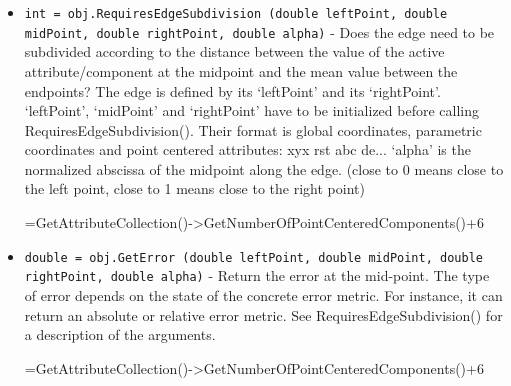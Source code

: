 \begin{itemize}
\item  \verb|int = obj.RequiresEdgeSubdivision (double leftPoint, double midPoint, double rightPoint, double alpha)| -  Does the edge need to be subdivided according to the distance between
 the value of the active attribute/component at the midpoint and the mean
 value between the endpoints?
 The edge is defined by its `leftPoint' and its `rightPoint'.
 `leftPoint', `midPoint' and `rightPoint' have to be initialized before
 calling RequiresEdgeSubdivision().
 Their format is global coordinates, parametric coordinates and
 point centered attributes: xyx rst abc de...
 `alpha' is the normalized abscissa of the midpoint along the edge.
 (close to 0 means close to the left point, close to 1 means close to the
 right point)
 
 
 
 
 
          =GetAttributeCollection()->GetNumberOfPointCenteredComponents()+6

\item  \verb|double = obj.GetError (double leftPoint, double midPoint, double rightPoint, double alpha)| -  Return the error at the mid-point. The type of error depends on the state
 of the concrete error metric. For instance, it can return an absolute
 or relative error metric.
 See RequiresEdgeSubdivision() for a description of the arguments.
 
 
 
 
 
          =GetAttributeCollection()->GetNumberOfPointCenteredComponents()+6
 

\end{itemize}
